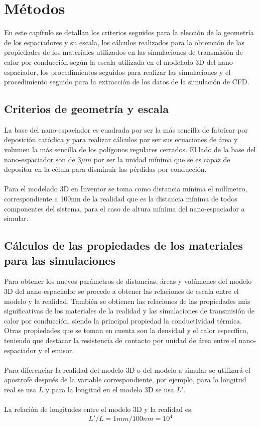 \chapter{Métodos}
En este capítulo se detallan los criterios seguidos para la elección de la geometría de los espaciadores y su escala, los cálculos realizados para la obtención de las propiedades de los materiales utilizados en las simulaciones de transmisión de calor por conducción según la escala utilizada en el modelado 3D del nano-espaciador, los procedimientos seguidos para realizar las simulaciones y el procedimiento seguido para la extracción de los datos de la simulación de CFD.
\section{Criterios de geometría y escala} 
La base del nano-espaciador es cuadrada por ser la más sencilla de fabricar por deposición catódica y para realizar cálculos por ser sus ecuaciones de área y volumen la más sencilla de los polígonos regulares cerrados. El lado de la base del nano-espaciador son de 3$\mu m$ por ser la unidad mínima que se es capaz de depositar en la célula para disminuir las pérdidas por conducción.\\\\
Para el modelado 3D en Inventor se toma como distancia mínima el milímetro, correspondiente a 100nm de la realidad que es la distancia mínima de todos componentes del sistema, para el caso de altura mínima del nano-espaciador a simular.
\section{Cálculos de las propiedades de los materiales para las simulaciones}
Para obtener los nuevos parámetros de distancias, áreas y volúmenes del modelo 3D del nano-espaciador se procede a obtener las relaciones de escala entre el modelo y la realidad. También se obtienen las relaciones de las propiedades más significativas de los materiales de la realidad y las simulaciones de transmisión de calor por conducción, siendo la principal propiedad la conductividad térmica. Otras propiedades que se toman en cuenta son la densidad y el calor específico, teniendo que destacar la resistencia de contacto por unidad de área entre el nano-espaciador y el emisor.\\\\
Para diferenciar la realidad del modelo 3D o del modelo a simular se utilizará el apostrofe después de la variable correspondiente, por ejemplo, para la longitud real se usa $L$ y para la longitud en el modelo 3D se usa $L'$.\\\\
La relación de longitudes entre el modelo 3D y la realidad es:
\begin{equation}
{L'}/{L}={1mm}/{100nm}=10^4
\label{eq:relacion_longitud}
\end{equation}
